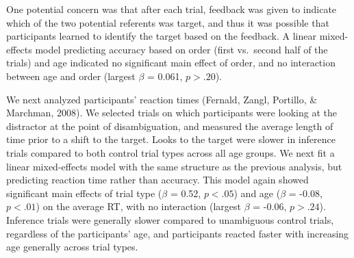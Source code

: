 \documentclass[a4paper,man,apacite,floatsintext]{apa6}
\begin{document}
One potential concern was that after each trial, feedback was given to
indicate which of the two potential referents was target, and thus it
was possible that participants learned to identify the target based on
the feedback. A linear mixed-effects model predicting accuracy based on
order (first vs.~second half of the trials) and age indicated no
significant main effect of order, and no interaction between age and
order (largest \(\beta\) = 0.061, \(p >.20\)).

We next analyzed participants' reaction times (Fernald, Zangl, Portillo,
\& Marchman, 2008). We selected trials on which participants were
looking at the distractor at the point of disambiguation, and measured
the average length of time prior to a shift to the target. Looks to the
target were slower in inference trials compared to both control trial
types across all age groups. We next fit a linear mixed-effects model
with the same structure as the previous analysis, but predicting
reaction time rather than accuracy. This model again showed significant
main effects of trial type (\(\beta\) = 0.52, \(p <.05\)) and age
(\(\beta\) = -0.08, \(p <.01\)) on the average RT, with no interaction
(largest \(\beta\) = -0.06, \(p >.24\)). Inference trials were generally
slower compared to unambiguous control trials, regardless of the
participants' age, and participants reacted faster with increasing age
generally across trial types.
\end{document}
